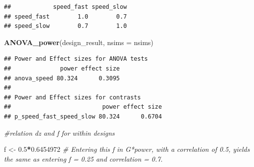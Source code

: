 \documentclass[]{article}
\newenvironment{Shaded}{\begin{snugshade}}{\end{snugshade}}
\newcommand{\KeywordTok}[1]{\textcolor[rgb]{0.13,0.29,0.53}{\textbf{#1}}}
\newcommand{\DataTypeTok}[1]{\textcolor[rgb]{0.13,0.29,0.53}{#1}}
\newcommand{\FloatTok}[1]{\textcolor[rgb]{0.00,0.00,0.81}{#1}}
\newcommand{\StringTok}[1]{\textcolor[rgb]{0.31,0.60,0.02}{#1}}
\newcommand{\CommentTok}[1]{\textcolor[rgb]{0.56,0.35,0.01}{\textit{#1}}}
\newcommand{\OperatorTok}[1]{\textcolor[rgb]{0.81,0.36,0.00}{\textbf{#1}}}
\newcommand{\NormalTok}[1]{#1}
\begin{document}
\begin{verbatim}
##            speed_fast speed_slow
## speed_fast        1.0        0.7
## speed_slow        0.7        1.0
\end{verbatim}

\begin{Shaded}
\begin{Highlighting}[]
\KeywordTok{ANOVA_power}\NormalTok{(design_result, }\DataTypeTok{nsims =}\NormalTok{ nsims)}
\end{Highlighting}
\end{Shaded}

\begin{verbatim}
## Power and Effect sizes for ANOVA tests
##              power effect size
## anova_speed 80.324      0.3095
## 
## Power and Effect sizes for contrasts
##                          power effect size
## p_speed_fast_speed_slow 80.324      0.6704
\end{verbatim}

\begin{Shaded}
\begin{Highlighting}[]
\CommentTok{#relation dz and f for within designs }

\NormalTok{f <-}\StringTok{ }\FloatTok{0.5}\OperatorTok{*}\FloatTok{0.6454972}
\CommentTok{# Entering this f in G*power, with a correlation of 0.5, yields the same as entering f = 0.25 and correlation = 0.7. }
\end{Highlighting}
\end{Shaded}
\end{document}
